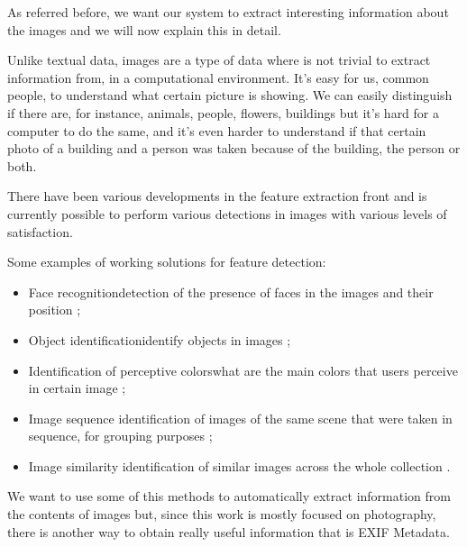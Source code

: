 
As referred before, we want our system to extract interesting information about the images and we will now explain this in detail.


Unlike textual data, images are a type of data where is not trivial to extract information from, in a computational environment. It's easy for us, common people, to understand what certain picture is showing. We can easily distinguish if there are, for instance, animals, people, flowers, buildings but it's hard for a computer to do the same, and it's even harder to understand if that certain photo of a building and a person was taken because of the building, the person or both.

There have been various developments in the feature extraction front  and is currently possible to perform various detections in images with various levels of satisfaction.

Some examples of working solutions for feature detection:

\begin{itemize}
	\item{Face recognition\newline detection of the presence of faces in the images and their position \cite{Vasconcelos:2005in,Chen:2003p3699,Tamura:2002p859,Hsu:2002p3675};}
	\item{Object identification\newline identify objects in images \cite{Torralba:2008p527};}
	\item{Identification of perceptive colors\newline  what are the main colors that users perceive in certain image \cite{Sural:2002bt};}
	\item{Image sequence \newline  identification of images of the same scene that were taken in sequence, for grouping purposes \cite{Cooper:2003p3679};}
	\item{Image similarity \newline  identification of similar images across the whole collection \cite{Vasconcelos:2005in,Zaheer:2010p3735}.}
\end{itemize}

We want to use some of this methods to automatically extract information from the contents of images but, since this work is mostly focused on photography, there is another way to obtain really useful information that is EXIF Metadata.


